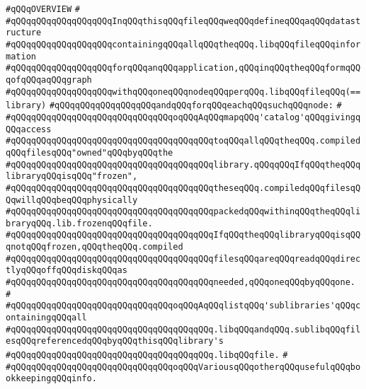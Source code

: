 \verb|#qQQqOVERVIEW|\newline
\verb|#|\newline
\verb|#qQQqqQQqqQQqqQQqqQQqInqQQqthisqQQqfileqQQqweqQQqdefineqQQqaqQQqdatastructure|\newline
\verb|#qQQqqQQqqQQqqQQqqQQqcontainingqQQqallqQQqtheqQQq.libqQQqfileqQQqinformation|\newline
\verb|#qQQqqQQqqQQqqQQqqQQqforqQQqanqQQqapplication,qQQqinqQQqtheqQQqformqQQqofqQQqaqQQqgraph|\newline
\verb|#qQQqqQQqqQQqqQQqqQQqwithqQQqoneqQQqnodeqQQqperqQQq.libqQQqfileqQQq(==library)|\newline
\verb|#qQQqqQQqqQQqqQQqqQQqandqQQqforqQQqeachqQQqsuchqQQqnode:|\newline
\verb|#|\newline
\verb|#qQQqqQQqqQQqqQQqqQQqqQQqqQQqqQQqoqQQqAqQQqmapqQQq'catalog'qQQqgivingqQQqaccess|\newline
\verb|#qQQqqQQqqQQqqQQqqQQqqQQqqQQqqQQqqQQqqQQqtoqQQqallqQQqtheqQQq.compiledqQQqfilesqQQq"owned"qQQqbyqQQqthe|\newline
\verb|#qQQqqQQqqQQqqQQqqQQqqQQqqQQqqQQqqQQqqQQqlibrary.qQQqqQQqIfqQQqtheqQQqlibraryqQQqisqQQq"frozen",|\newline
\verb|#qQQqqQQqqQQqqQQqqQQqqQQqqQQqqQQqqQQqqQQqtheseqQQq.compiledqQQqfilesqQQqwillqQQqbeqQQqphysically|\newline
\verb|#qQQqqQQqqQQqqQQqqQQqqQQqqQQqqQQqqQQqqQQqpackedqQQqwithinqQQqtheqQQqlibraryqQQq.lib.frozenqQQqfile.|\newline
\verb|#qQQqqQQqqQQqqQQqqQQqqQQqqQQqqQQqqQQqqQQqIfqQQqtheqQQqlibraryqQQqisqQQqnotqQQqfrozen,qQQqtheqQQq.compiled|\newline
\verb|#qQQqqQQqqQQqqQQqqQQqqQQqqQQqqQQqqQQqqQQqfilesqQQqareqQQqreadqQQqdirectlyqQQqoffqQQqdiskqQQqas|\newline
\verb|#qQQqqQQqqQQqqQQqqQQqqQQqqQQqqQQqqQQqqQQqneeded,qQQqoneqQQqbyqQQqone.|\newline
\verb|#|\newline
\verb|#qQQqqQQqqQQqqQQqqQQqqQQqqQQqqQQqoqQQqAqQQqlistqQQq'sublibraries'qQQqcontainingqQQqall|\newline
\verb|#qQQqqQQqqQQqqQQqqQQqqQQqqQQqqQQqqQQqqQQq.libqQQqandqQQq.sublibqQQqfilesqQQqreferencedqQQqbyqQQqthisqQQqlibrary's|\newline
\verb|#qQQqqQQqqQQqqQQqqQQqqQQqqQQqqQQqqQQqqQQq.libqQQqfile.|\newline
\verb|#|\newline
\verb|#qQQqqQQqqQQqqQQqqQQqqQQqqQQqqQQqoqQQqVariousqQQqotherqQQqusefulqQQqbookkeepingqQQqinfo.|\newline

